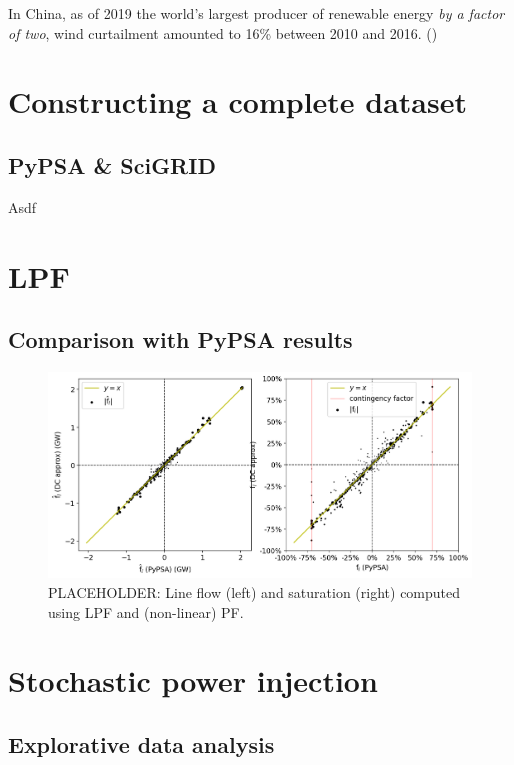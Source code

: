\documentclass[main.tex]{subfiles}
\begin{document}
In China, as of 2019 the world's largest producer of renewable energy \emph{by a factor of two},  wind curtailment amounted to 16\% between 2010 and 2016. (\cite{Qi2018})



\section{Constructing a complete dataset}
\subsection{PyPSA \& SciGRID}
Asdf
\section{LPF}
\subsection{Comparison with PyPSA results}
\begin{figure}
    \centering
    \includegraphics[width=\textwidth]{img/lineflowcorr.png}
    \caption{PLACEHOLDER: Line flow (left) and saturation (right) computed using LPF and (non-linear) PF.}
    \label{fig:generationtech}
\end{figure}
\section{Stochastic power injection}
\subsection{Explorative data analysis}
\end{document}
